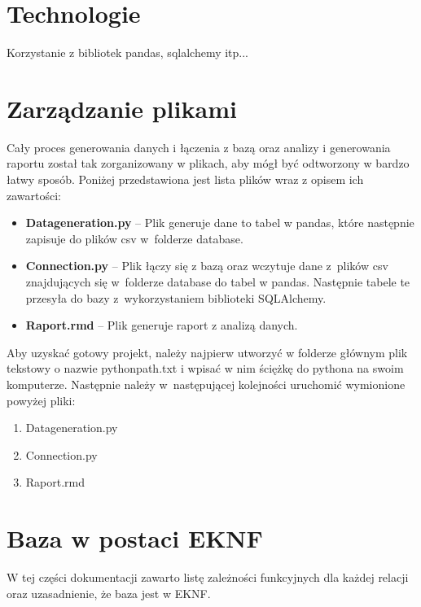 \documentclass{article}
\begin{document}
	
	\section{Technologie}
	
	Korzystanie z bibliotek pandas, sqlalchemy itp...
	
	
	
	\section{Zarządzanie plikami}
	Cały proces generowania danych i łączenia z bazą oraz analizy i generowania raportu został tak zorganizowany w plikach, aby mógł być odtworzony w bardzo łatwy sposób. Poniżej przedstawiona jest lista plików wraz z opisem ich zawartości:
	\begin{itemize}
		\setlength{\itemsep}{-2pt}
		\item \textbf{Data\textunderscore generation.py} – Plik generuje dane to tabel w pandas, które następnie zapisuje do plików csv w~folderze database.
		\item \textbf{Connection.py} – Plik łączy się z bazą oraz wczytuje dane z~plików csv znajdujących się w~folderze database do tabel w pandas.
		Następnie tabele te przesyła do bazy z~wykorzystaniem biblioteki SQLAlchemy.
		\item \textbf{Raport.rmd} – Plik generuje raport z analizą danych.	
	\end{itemize}
	
	
	\noindent Aby uzyskać gotowy projekt, należy najpierw utworzyć w folderze głównym plik tekstowy o nazwie python\textunderscore path.txt i wpisać w nim ściężkę do pythona na swoim komputerze. Następnie należy w~następującej kolejności uruchomić wymionione powyżej pliki:
	\begin{enumerate}
		\setlength{\itemsep}{-2pt}
		\item Data\textunderscore generation.py
		\item Connection.py
		\item Raport.rmd
	\end{enumerate}
	
	\section{Baza w postaci EKNF}
	W tej części dokumentacji zawarto listę zależności funkcyjnych dla każdej relacji oraz uzasadnienie, że baza jest w EKNF.
	
\end{document}
